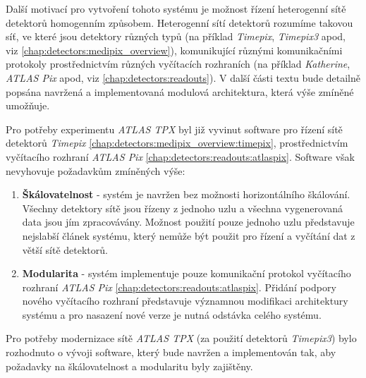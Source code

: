  Další motivací pro vytvoření tohoto systému je možnost řízení heterogenní sítě detektorů homogenním způsobem. Heterogenní sítí detektorů rozumíme takovou síť, ve které jsou detektory různých typů (na příklad \textit{Timepix}, \textit{Timepix3} apod, viz \ref{chap:detectors:medipix_overview}), komunikující různými komunikačními protokoly prostřednictvím různých vyčítacích rozhraních (na příklad \textit{Katherine}, \textit{ATLAS Pix} apod, viz \ref{chap:detectors:readouts}). V další části textu bude detailně popsána navržená a implementovaná modulová architektura, která výše zmíněné umožňuje.

 Pro potřeby experimentu \textit{ATLAS TPX} byl již vyvinut software \cite{atlastpx_sw,BegeraBcThesis2016} pro řízení sítě detektorů \textit{Timepix} \ref{chap:detectors:medipix_overview:timepix}, prostřednictvím vyčítacího rozhraní \textit{ATLAS Pix} \ref{chap:detectors:readouts:atlaspix}. Software však nevyhovuje požadavkům zmíněných výše:
 \begin{enumerate}[label=(\roman*)]
     \item \textbf{Škálovatelnost} - systém je navržen bez možnosti horizontálního škálování. Všechny detektory sítě jsou řízeny z jednoho uzlu a všechna vygenerovaná data jsou jím zpracovávány. Možnost použití pouze jednoho uzlu představuje nejslabší článek systému, který nemůže být použit pro řízení a vyčítání dat z větší sítě detektorů.
     \item \textbf{Modularita} - systém implementuje pouze komunikační protokol vyčítacího rozhraní \textit{ATLAS Pix} \ref{chap:detectors:readouts:atlaspix}. Přidání podpory nového vyčítacího rozhraní představuje významnou modifikaci architektury systému a pro nasazení nové verze je nutná odstávka celého systému.
 \end{enumerate}
Pro potřeby modernizace sítě \textit{ATLAS TPX} (za použití detektorů \textit{Timepix3}) bylo rozhodnuto o vývoji software, který bude navržen a implementován tak, aby požadavky na škálovatelnost a modularitu byly zajištěny.